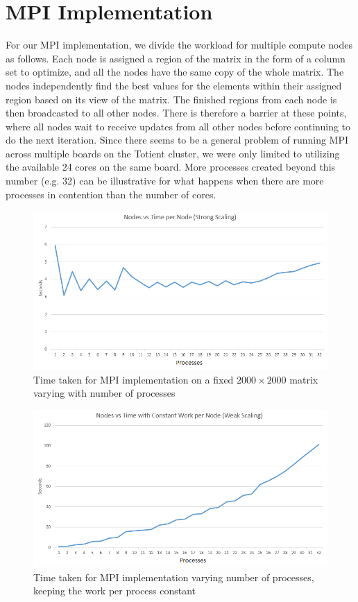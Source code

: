 \documentclass{article}
\begin{document}
\section{MPI Implementation}
For our MPI implementation, we divide the workload for multiple compute nodes as follows. Each node is assigned a region of the matrix in the form of a column set to optimize, and all the nodes have the same copy of the whole matrix. The nodes independently find the best values for the elements within their assigned region based on its view of the matrix. The finished regions from each node is then broadcasted to all other nodes. There is therefore a barrier at these points, where all nodes wait to receive updates from all other nodes before continuing to do the next iteration. Since there seems to be a general problem of running MPI across multiple boards on the Totient cluster, we were only limited to utilizing the available 24 cores on the same board. More processes created beyond this number (e.g. 32) can be illustrative for what happens when there are more processes in contention than the number of cores.

 \begin{figure}[h]
  \centering
  \includegraphics[width=0.7\linewidth]{mpi-strong.png}
 \caption{Time taken for MPI implementation on a fixed $2000 \times 2000$ matrix varying with number of processes}
  \label{strong-mpi}
\end{figure}
\newpage
 \begin{figure}[h]
  \centering
  \includegraphics[width=0.7\linewidth]{mpi-weak.png}
 \caption{Time taken for MPI implementation varying number of processes, keeping the work per process constant}
  \label{weak-mpi}
\end{figure}
\end{document}

